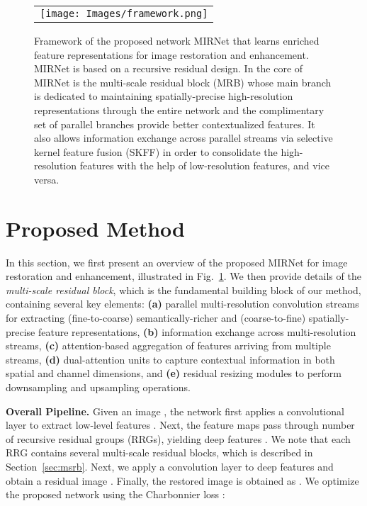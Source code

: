 \documentclass[runningheads]{llncs}
\begin{document}
\begin{figure}[t]
\begin{center}
\begin{tabular}[t]{c} \hspace{-2mm}
\texttt{[image: Images/framework.png]}
\end{tabular}
\end{center}
\vspace*{-4mm}
\caption{\small Framework of the proposed network MIRNet that learns enriched feature representations for image restoration and enhancement. MIRNet is based on a recursive residual design. In the core of MIRNet is the multi-scale residual block (MRB) whose main branch is dedicated to maintaining spatially-precise high-resolution representations through the entire  network and the complimentary set of parallel branches provide better contextualized features. It also allows information exchange across parallel streams via selective kernel feature fusion (SKFF) in order to consolidate the high-resolution features with the help of low-resolution features, and vice versa.}
\label{fig:framework}
\vspace{-1em}
\end{figure}

\section{Proposed Method}
In this section, we first present an overview of the proposed MIRNet for image restoration and enhancement, illustrated in Fig.~\ref{fig:framework}.
We then provide details of the \emph{multi-scale residual block}, which is the fundamental building block of our method, containing several key elements: \textbf{(a)} parallel multi-resolution convolution streams for extracting (fine-to-coarse) semantically-richer and (coarse-to-fine) spatially-precise feature representations, \textbf{(b)} information exchange across multi-resolution streams, \textbf{(c)} attention-based aggregation of features arriving from multiple streams, \textbf{(d)} dual-attention units to capture contextual information in both spatial and channel dimensions, and \textbf{(e)} residual resizing modules to perform downsampling and upsampling operations.   



\vspace{0.4em} \noindent \textbf{Overall Pipeline.} 
Given an image , the network first applies a convolutional layer to extract low-level features .
Next, the feature maps  pass through  number of recursive residual groups (RRGs), yielding deep features . 
We note that each RRG contains several multi-scale residual blocks, which is described in Section~\ref{sec:msrb}. 
Next, we apply a convolution layer to deep features  and obtain a residual image . 
Finally, the restored image is obtained as .   
We optimize the proposed network using the Charbonnier loss \cite{charbonnier1994}: 
\end{document}

